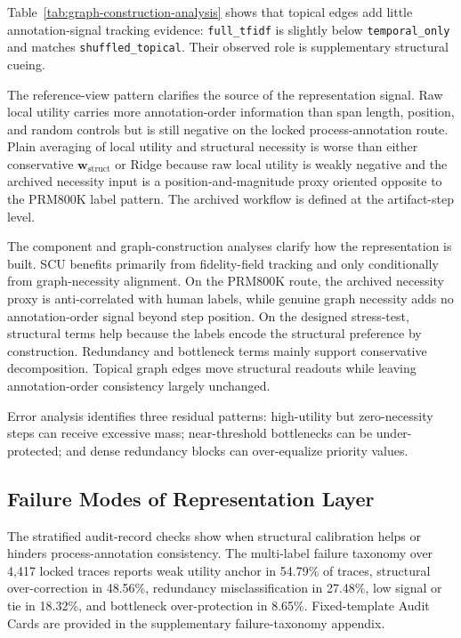\documentclass[pdflatex,sn-mathphys-num,iicol]{sn-jnl}
\newcommand{\wstruct}{\ensuremath{\mathbf{w}_{\mathrm{struct}}}}
\begin{document}
Table~\ref{tab:graph-construction-analysis} shows that topical edges add little annotation-signal tracking evidence: \texttt{full\_tfidf} is slightly below \texttt{temporal\_only} and matches \texttt{shuffled\_topical}. Their observed role is supplementary structural cueing.

The reference-view pattern clarifies the source of the representation signal. Raw local utility carries more annotation-order information than span length, position, and random controls but is still negative on the locked process-annotation route. Plain averaging of local utility and structural necessity is worse than either conservative \wstruct{} or Ridge because raw local utility is weakly negative and the archived necessity input is a position-and-magnitude proxy oriented opposite to the PRM800K label pattern. The archived workflow is defined at the artifact-step level.

The component and graph-construction analyses clarify how the representation is built. SCU benefits primarily from fidelity-field tracking and only conditionally from graph-necessity alignment. On the PRM800K route, the archived necessity proxy is anti-correlated with human labels, while genuine graph necessity adds no annotation-order signal beyond step position. On the designed stress-test, structural terms help because the labels encode the structural preference by construction. Redundancy and bottleneck terms mainly support conservative decomposition. Topical graph edges move structural readouts while leaving annotation-order consistency largely unchanged.

Error analysis identifies three residual patterns: high-utility but zero-necessity steps can receive excessive mass; near-threshold bottlenecks can be under-protected; and dense redundancy blocks can over-equalize priority values.

\subsection{Failure Modes of Representation Layer}
\label{sec:prm800k-error}

The stratified audit-record checks show when structural calibration helps or hinders process-annotation consistency. The multi-label failure taxonomy over 4,417 locked traces reports weak utility anchor in 54.79\% of traces, structural over-correction in 48.56\%, redundancy misclassification in 27.48\%, low signal or tie in 18.32\%, and bottleneck over-protection in 8.65\%. Fixed-template Audit Cards are provided in the supplementary failure-taxonomy appendix.
\end{document}
